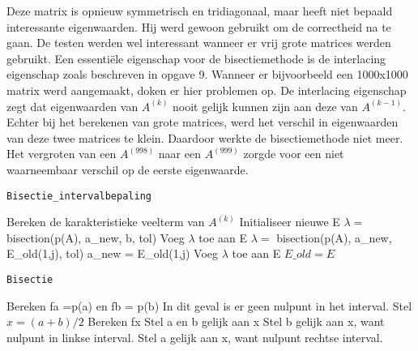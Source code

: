 Deze matrix is opnieuw symmetrisch en tridiagonaal, maar heeft niet bepaald interessante eigenwaarden. Hij werd gewoon gebruikt om de correctheid na te gaan. De testen werden wel interessant wanneer er vrij grote matrices werden gebruikt. Een essenti\"ele eigenschap voor de bisectiemethode is de interlacing eigenschap zoals beschreven in opgave 9. Wanneer er bijvoorbeeld een 1000x1000 matrix werd aangemaakt, doken er hier problemen op. De interlacing eigenschap zegt dat eigenwaarden van $A^{(k)}$ nooit gelijk kunnen zijn aan deze van $A^{(k-1)}$. Echter bij het berekenen van grote matrices, werd het verschil in eigenwaarden van deze twee matrices te klein. Daardoor werkte de bisectiemethode niet meer. Het vergroten van een $A^{(998)}$ naar een $A^{(999)}$ zorgde voor een niet waarneembaar verschil op de eerste eigenwaarde.\\




\begin{algorithm}[ht!]
	\caption{\texttt{Bisectie\_intervalbepaling}}
	\label{Bisectie_intervalbepaling}
	\begin{algorithmic}[1]
			\State Bereken de karakteristieke veelterm van $A^{(k)}$
			\State Initialiseer nieuwe E
				\State $\lambda =$ bisection(p(A), a\_new, b, tol)
				\State Voeg $\lambda$ toe aan E	
			\Else
				\State $\lambda =$  bisection(p(A), a\_new, E\_old(1,j), tol)
				\State a\_new = E\_old(1,j)
				\State Voeg $\lambda$ toe aan E
			\EndIf
			\EndFor
			\State $E\_old = E$
		\EndFor
		\State {}
		\EndProcedure
	\end{algorithmic}
\end{algorithm}

\begin{algorithm}[ht!]
	\caption{\texttt{Bisectie}}
	\label{Bisectie}
	\begin{algorithmic}[1]
			\State Bereken fa =p(a) en fb = p(b)
				\State In dit geval is er geen nulpunt in het interval.
				\State {}
			\Else
				\State Stel $x = (a+b)/2$
				\State Bereken fx
				\State Stel a en b gelijk aan x
				\State Stel b gelijk aan x, want nulpunt in linkse interval.
			\Else
				\State Stel a gelijk aan x, want nulpunt rechtse interval.
			\EndIf
			\EndIf
		\EndWhile
		\State {}
		\EndProcedure
	\end{algorithmic}
\end{algorithm}